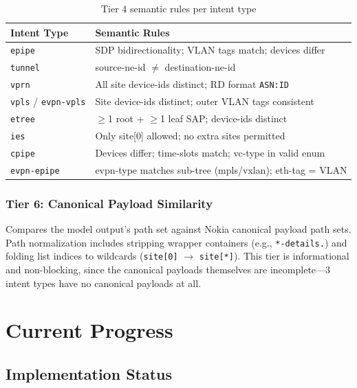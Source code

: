 \documentclass[12pt, a4paper]{article}
\newcommand{\intenttype}[1]{\texttt{#1}}
\begin{document}
\begin{table}[H]
\centering
\caption{Tier 4 semantic rules per intent type}
\label{tab:semantic-rules}
\small
\begin{tabular}{lp{9cm}}
\toprule
\textbf{Intent Type} & \textbf{Semantic Rules} \\
\midrule
\intenttype{epipe} &
  SDP bidirectionality; VLAN tags match; devices differ \\
\intenttype{tunnel} &
  source-ne-id $\neq$ destination-ne-id \\
\intenttype{vprn} &
  All site device-ids distinct; RD format \texttt{ASN:ID} \\
\intenttype{vpls} / \intenttype{evpn-vpls} &
  Site device-ids distinct; outer VLAN tags consistent \\
\intenttype{etree} &
  $\geq$1 root + $\geq$1 leaf SAP; device-ids distinct \\
\intenttype{ies} &
  Only site[0] allowed; no extra sites permitted \\
\intenttype{cpipe} &
  Devices differ; time-slots match; vc-type in valid enum \\
\intenttype{evpn-epipe} &
  evpn-type matches sub-tree (mpls/vxlan); eth-tag = VLAN \\
\bottomrule
\end{tabular}
\end{table}

\subsubsection{Tier 6: Canonical Payload Similarity}
\label{sec:tier6}

Compares the model output's path set against Nokia canonical payload path sets. Path normalization includes stripping wrapper containers (e.g., \texttt{*-details.}) and folding list indices to wildcards (\texttt{site[0]} $\to$ \texttt{site[*]}). This tier is informational and non-blocking, since the canonical payloads themselves are incomplete---3 intent types have no canonical payloads at all.

\section{Current Progress}

\subsection{Implementation Status}
\end{document}
